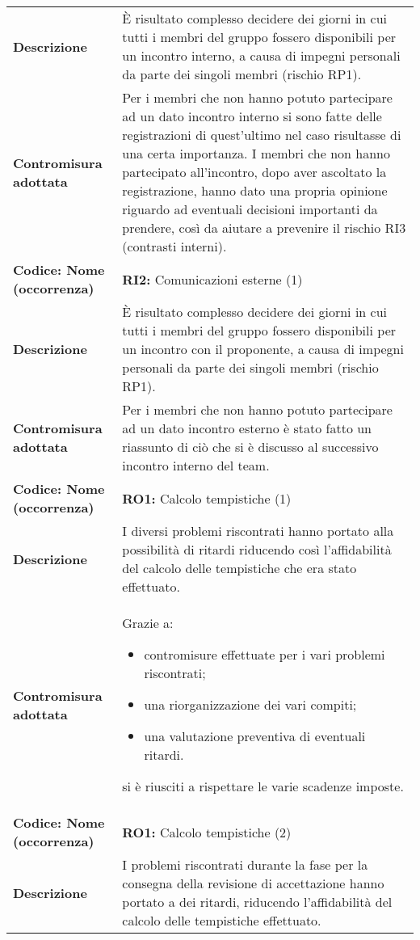 {\begin{longtable}{C{3.5cm} | C{11cm}}
\textbf{Descrizione} & È risultato complesso decidere dei giorni in cui tutti i membri del gruppo fossero disponibili per un incontro interno, a causa di impegni personali da parte dei singoli membri (rischio RP1).\\ 
\textbf{Contromisura adottata} & Per i membri che non hanno potuto partecipare ad un dato incontro interno si sono fatte delle registrazioni di quest'ultimo nel caso risultasse di una certa importanza. I membri che non hanno partecipato all'incontro, dopo aver ascoltato la registrazione, hanno dato una propria opinione riguardo ad eventuali decisioni importanti da prendere, così da aiutare a prevenire il rischio RI3 (contrasti interni).\\
\hline
\hline
{}\textbf{Codice: Nome (occorrenza)} & \textbf{RI2: }{Comunicazioni esterne (1)}\\ 
\textbf{Descrizione} & È risultato complesso decidere dei giorni in cui tutti i membri del gruppo fossero disponibili per un incontro con il proponente, a causa di impegni personali da parte dei singoli membri (rischio RP1).\\ 
\textbf{Contromisura adottata} & Per i membri che non hanno potuto partecipare ad un dato incontro esterno è stato fatto un riassunto di ciò che si è discusso al successivo incontro interno del team.\\
\hline
\hline
{}\textbf{Codice: Nome (occorrenza)} & \textbf{RO1: }{Calcolo tempistiche (1)}\\
\textbf{Descrizione} & I diversi problemi riscontrati hanno portato alla possibilità di ritardi riducendo così l'affidabilità del calcolo delle tempistiche che era stato effettuato.\\
\textbf{Contromisura adottata} & Grazie a: 
\begin{itemize}
\item contromisure effettuate per i vari problemi riscontrati;
\item una riorganizzazione dei vari compiti;
\item una valutazione preventiva di eventuali ritardi.
\end{itemize} 
si è riusciti a rispettare le varie scadenze imposte.\\
\hline
\hline
{}\textbf{Codice: Nome (occorrenza)} & \textbf{RO1: }{Calcolo tempistiche (2)}\\
\textbf{Descrizione} & I problemi riscontrati durante la fase per la consegna della revisione di accettazione hanno portato a dei ritardi, riducendo l'affidabilità del calcolo delle tempistiche effettuato.\\

\end{longtable}}
